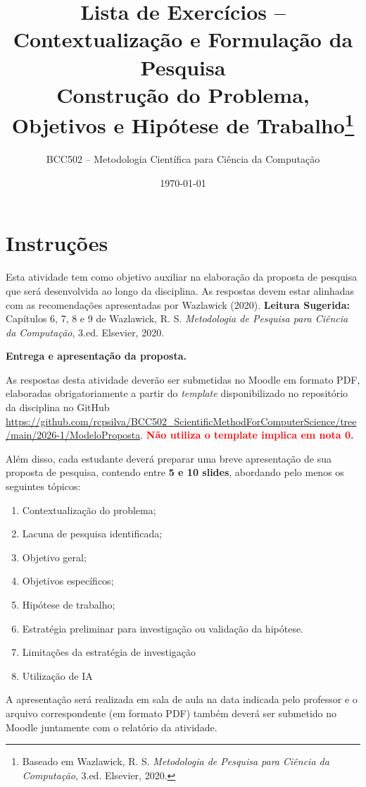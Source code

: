 \documentclass[10pt,a4paper]{extarticle}
\title{Lista de Exercícios -- Contextualização e Formulação da Pesquisa\\
\large Construção do Problema, Objetivos e Hipótese de Trabalho\footnote{Baseado em Wazlawick, R. S. \textit{Metodologia de Pesquisa para Ciência da Computação}, 3.ed. Elsevier, 2020.}}
\author{BCC502 -- Metodologia Científica para Ciência da Computação}
\date{\today}
\begin{document}
\maketitle

\section*{Instruções}

Esta atividade tem como objetivo auxiliar na elaboração da proposta de pesquisa que será desenvolvida ao longo da disciplina. As respostas devem estar alinhadas com as recomendações apresentadas por Wazlawick (2020). \textbf{Leitura Sugerida:} Capítulos 6, 7, 8 e 9 de Wazlawick, R. S. \textit{Metodologia de Pesquisa para Ciência da Computação}, 3.ed. Elsevier, 2020.

\textbf{Entrega e apresentação da proposta.}

As respostas desta atividade deverão ser submetidas no Moodle em formato PDF, elaboradas obrigatoriamente a partir do \textit{template} disponibilizado no repositório da disciplina no GitHub \url{https://github.com/rcpsilva/BCC502_ScientificMethodForComputerScience/tree/main/2026-1/ModeloProposta}. \textcolor{red}{\textbf{Não utiliza o template implica em nota 0.}}

Além disso, cada estudante deverá preparar uma breve apresentação de sua proposta de pesquisa, contendo entre \textbf{5 e 10 slides}, abordando pelo menos os seguintes tópicos:

\begin{enumerate}[label=(\alph*)]
    \item Contextualização do problema;
    \item Lacuna de pesquisa identificada;
    \item Objetivo geral;
    \item Objetivos específicos;
    \item Hipótese de trabalho;
    \item Estratégia preliminar para investigação ou validação da hipótese.
    \item Limitações da estratégia de investigação
    \item Utilização de IA
\end{enumerate}

A apresentação será realizada em sala de aula na data indicada pelo professor e o arquivo correspondente (em formato PDF) também deverá ser submetido no Moodle juntamente com o relatório da atividade.
\end{document}
